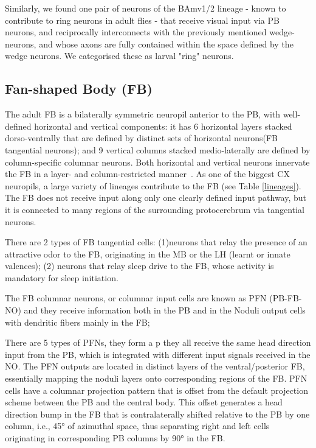 \documentclass{article}
\begin{document}
Similarly, we found one pair of neurons of the BAmv1/2 lineage - known to contribute to ring neurons in adult flies - that receive visual input via PB neurons, and reciprocally interconnects with the previously mentioned wedge-neurons, and whose axons are fully contained within the space defined by the wedge neurons. We categorised these as larval "ring" neurons.


\subsection{Fan-shaped Body (FB)}


The adult FB is a bilaterally symmetric neuropil anterior to the PB, with well-defined horizontal and vertical components: it has 6 horizontal layers stacked dorso-ventrally that are defined by distinct sets of horizontal neurons(FB tangential neurons); and 9 vertical columns stacked medio-laterally are defined by column-specific columnar neurons. Both horizontal and vertical neurons innervate the FB in a layer- and column-restricted manner~\citep{heinze2017unraveling}. As one of the biggest CX neuropils, a large variety of lineages contribute to the FB (see Table \ref{lineages}).
The FB does not receive input along only one clearly defined input pathway, but it is connected to many regions of the surrounding protocerebrum via tangential neurons. 

There are 2 types of FB tangential cells: (1)neurons that relay the presence of an attractive odor to the FB, originating in the MB or the LH (learnt or innate valences); (2) neurons that relay sleep drive to the FB, whose activity is mandatory for sleep initiation. 

The FB columnar neurons, or columnar input cells are known as PFN (PB-FB-NO) and they receive information both in the PB and in the Noduli output cells with dendritic fibers mainly in the FB; 


There are 5 types of PFNs, they form a p they all receive the same head direction input from the PB, which is integrated with different input signals received in the NO. The PFN outputs are located in distinct layers of the ventral/posterior FB, essentially mapping the noduli layers onto corresponding regions of the FB. PFN cells have a columnar projection pattern that is offset from the default projection scheme between the PB and the central body. This offset generates a head direction bump in the FB that is contralaterally shifted relative to the PB by one column, i.e., 45° of azimuthal space, thus separating right and left cells originating in corresponding PB columns by 90° in the FB.
\end{document}
